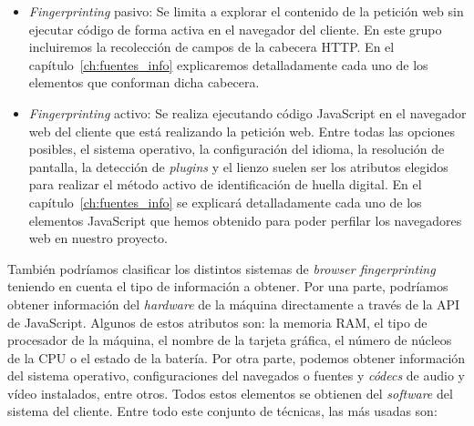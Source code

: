 \begin{itemize}
	\item \textit{Fingerprinting} pasivo: Se limita a explorar el contenido de la petición web sin ejecutar código de forma activa en el navegador del cliente. En este grupo incluiremos la recolección de campos de la cabecera HTTP. En el capítulo~\ref{ch:fuentes_info} explicaremos detalladamente cada uno de los elementos que conforman dicha cabecera. \par 
	
	\item \textit{Fingerprinting} activo:  Se realiza ejecutando código JavaScript en el navegador web del cliente que está realizando la petición web. Entre todas las opciones posibles, el sistema operativo, la configuración del idioma, la resolución de pantalla, la detección de \textit{plugins} y el lienzo suelen ser los atributos elegidos para realizar el método activo de identificación de huella digital. En el capítulo~\ref{ch:fuentes_info} se explicará detalladamente cada uno de los elementos JavaScript que hemos obtenido para poder perfilar los navegadores web en nuestro proyecto. \par 
	
\end{itemize}

También podríamos clasificar los distintos sistemas de \textit{browser fingerprinting} teniendo en cuenta el tipo de información a obtener. Por una parte, podríamos obtener información del \textit{hardware} de la máquina directamente a través de la API de JavaScript. Algunos de estos atributos son: la memoria RAM, el tipo de procesador de la máquina, el nombre de la tarjeta gráfica, el número de núcleos de la CPU o el estado de la batería. Por otra parte, podemos obtener información del sistema operativo, configuraciones del navegados o fuentes y \textit{códecs} de audio y vídeo instalados, entre otros. Todos estos elementos se obtienen del \textit{software} del sistema del cliente. Entre todo este conjunto de técnicas, las más usadas son: \par 

